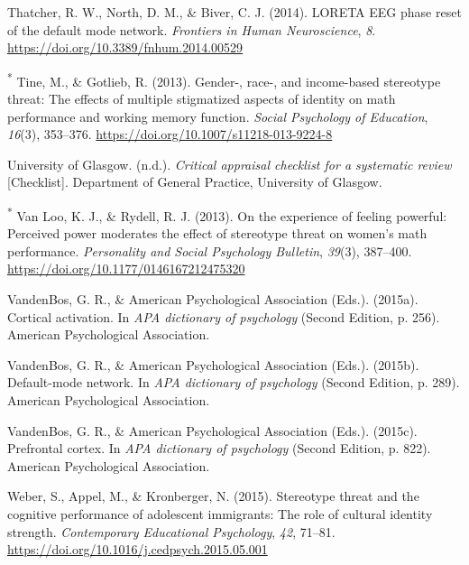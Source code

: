 \documentclass[
  stu, a4paper, 12pt,mask,floatsintext]{apa7}
\newlength{\cslhangindent}
\newenvironment{CSLReferences}[2] %
 {\begin{list}{}{%
  \setlength{\itemindent}{0pt}
  \setlength{\leftmargin}{0pt}
  \setlength{\parsep}{0pt}
  \ifodd #1
   \setlength{\leftmargin}{\cslhangindent}
   \setlength{\itemindent}{-1\cslhangindent}
  \fi
  \setlength{\itemsep}{#2\baselineskip}}}
 {\end{list}}
\begin{document}
\begin{CSLReferences}{1}{0}
Thatcher, R. W., North, D. M., \& Biver, C. J. (2014). {LORETA EEG} phase reset of the default mode network. \emph{Frontiers in Human Neuroscience}, \emph{8}. \url{https://doi.org/10.3389/fnhum.2014.00529}

\textsuperscript{*} Tine, M., \& Gotlieb, R. (2013). Gender-, race-, and income-based stereotype threat: The effects of multiple stigmatized aspects of identity on math performance and working memory function. \emph{Social Psychology of Education}, \emph{16}(3), 353--376. \url{https://doi.org/10.1007/s11218-013-9224-8}

University of Glasgow. (n.d.). \emph{Critical appraisal checklist for a systematic review} {[}Checklist{]}. Department of General Practice, University of Glasgow.

\textsuperscript{*} Van Loo, K. J., \& Rydell, R. J. (2013). On the experience of feeling powerful: {Perceived} power moderates the effect of stereotype threat on women's math performance. \emph{Personality and Social Psychology Bulletin}, \emph{39}(3), 387--400. \url{https://doi.org/10.1177/0146167212475320}

VandenBos, G. R., \& American Psychological Association (Eds.). (2015a). Cortical activation. In \emph{{APA} dictionary of psychology} (Second Edition, p. 256). American Psychological Association.

VandenBos, G. R., \& American Psychological Association (Eds.). (2015b). Default-mode network. In \emph{{APA} dictionary of psychology} (Second Edition, p. 289). American Psychological Association.

VandenBos, G. R., \& American Psychological Association (Eds.). (2015c). Prefrontal cortex. In \emph{{APA} dictionary of psychology} (Second Edition, p. 822). American Psychological Association.

Weber, S., Appel, M., \& Kronberger, N. (2015). Stereotype threat and the cognitive performance of adolescent immigrants: {The} role of cultural identity strength. \emph{Contemporary Educational Psychology}, \emph{42}, 71--81. \url{https://doi.org/10.1016/j.cedpsych.2015.05.001}


\end{CSLReferences}
\end{document}
